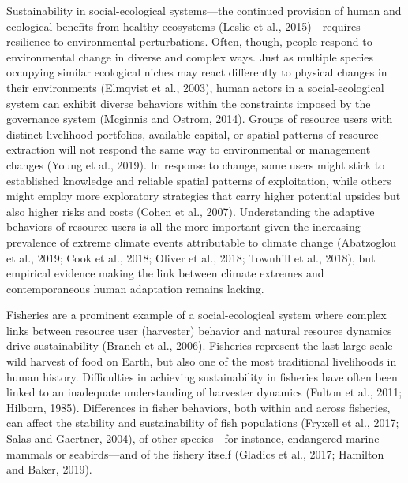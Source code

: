 \documentclass[]{elsarticle} %
\begin{document}
Sustainability in social-ecological systems---the continued provision of
human and ecological benefits from healthy ecosystems (Leslie et al.,
2015)---requires resilience to environmental perturbations. Often,
though, people respond to environmental change in diverse and complex
ways. Just as multiple species occupying similar ecological niches may
react differently to physical changes in their environments (Elmqvist et
al., 2003), human actors in a social-ecological system can exhibit
diverse behaviors within the constraints imposed by the governance
system (Mcginnis and Ostrom, 2014). Groups of resource users with
distinct livelihood portfolios, available capital, or spatial patterns
of resource extraction will not respond the same way to environmental or
management changes (Young et al., 2019). In response to change, some
users might stick to established knowledge and reliable spatial patterns
of exploitation, while others might employ more exploratory strategies
that carry higher potential upsides but also higher risks and costs
(Cohen et al., 2007). Understanding the adaptive behaviors of resource
users is all the more important given the increasing prevalence of
extreme climate events attributable to climate change (Abatzoglou et
al., 2019; Cook et al., 2018; Oliver et al., 2018; Townhill et al.,
2018), but empirical evidence making the link between climate extremes
and contemporaneous human adaptation remains lacking.

Fisheries are a prominent example of a social-ecological system where
complex links between resource user (harvester) behavior and natural
resource dynamics drive sustainability (Branch et al., 2006). Fisheries
represent the last large-scale wild harvest of food on Earth, but also
one of the most traditional livelihoods in human history. Difficulties
in achieving sustainability in fisheries have often been linked to an
inadequate understanding of harvester dynamics (Fulton et al., 2011;
Hilborn, 1985). Differences in fisher behaviors, both within and across
fisheries, can affect the stability and sustainability of fish
populations (Fryxell et al., 2017; Salas and Gaertner, 2004), of other
species---for instance, endangered marine mammals or seabirds---and of
the fishery itself (Gladics et al., 2017; Hamilton and Baker, 2019).
\end{document}
